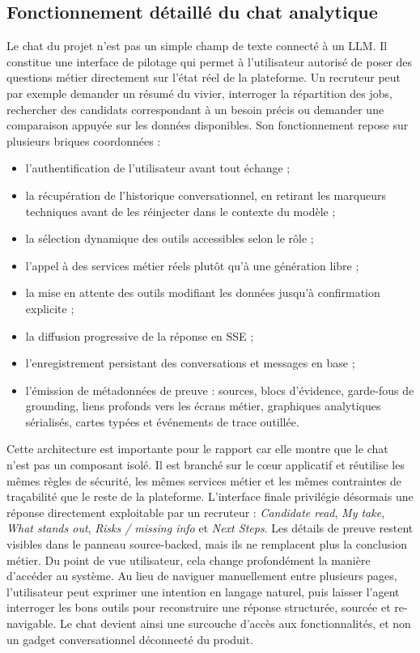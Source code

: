 \subsection{Fonctionnement détaillé du chat analytique}
Le chat du projet n'est pas un simple champ de texte connecté à un LLM. Il constitue une interface de pilotage qui permet à l'utilisateur autorisé de poser des questions métier directement sur l'état réel de la plateforme. Un recruteur peut par exemple demander un résumé du vivier, interroger la répartition des jobs, rechercher des candidats correspondant à un besoin précis ou demander une comparaison appuyée sur les données disponibles.
Son fonctionnement repose sur plusieurs briques coordonnées :
\begin{itemize}
  \item l'authentification de l'utilisateur avant tout échange ;
  \item la récupération de l'historique conversationnel, en retirant les marqueurs techniques avant de les réinjecter dans le contexte du modèle ;
  \item la sélection dynamique des outils accessibles selon le rôle ;
  \item l'appel à des services métier réels plutôt qu'à une génération libre ;
  \item la mise en attente des outils modifiant les données jusqu'à confirmation explicite ;
  \item la diffusion progressive de la réponse en SSE ;
  \item l'enregistrement persistant des conversations et messages en base ;
  \item l'émission de métadonnées de preuve : sources, blocs d'évidence, garde-fous de grounding, liens profonds vers les écrans métier, graphiques analytiques sérialisés, cartes typées et événements de trace outillée.
\end{itemize}
Cette architecture est importante pour le rapport car elle montre que le chat n'est pas un composant isolé. Il est branché sur le cœur applicatif et réutilise les mêmes règles de sécurité, les mêmes services métier et les mêmes contraintes de traçabilité que le reste de la plateforme. L'interface finale privilégie désormais une réponse directement exploitable par un recruteur : \textit{Candidate read}, \textit{My take}, \textit{What stands out}, \textit{Risks / missing info} et \textit{Next Steps}. Les détails de preuve restent visibles dans le panneau source-backed, mais ils ne remplacent plus la conclusion métier.
Du point de vue utilisateur, cela change profondément la manière d'accéder au système. Au lieu de naviguer manuellement entre plusieurs pages, l'utilisateur peut exprimer une intention en langage naturel, puis laisser l'agent interroger les bons outils pour reconstruire une réponse structurée, sourcée et re-navigable. Le chat devient ainsi une surcouche d'accès aux fonctionnalités, et non un gadget conversationnel déconnecté du produit.

